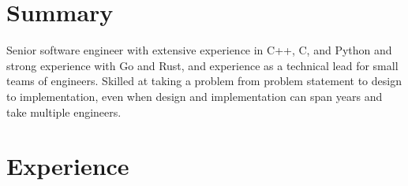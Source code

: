 \documentclass[overlapped]{res}
\begin{document}

\address{
  \href{mailto:miriam@mutexlox.com}{miriam@mutexlox.com} \\
  \hfill \href{https://www.linkedin.com/in/miriam-zimmerman-9a2507117}{www.linkedin.com/in/miriam-zimmerman-9a2507117} \\
}
\address{  %
  \hfill \href{https://mutexlox.com}{https://mutexlox.com} \\
  \hfill Boston, Massachusetts
}

\begin{resume}


\section{Summary}
  Senior software engineer with extensive experience in C++, C, and Python and
  strong experience with Go and Rust, and experience as a technical lead for
  small teams of engineers. Skilled at taking a problem from problem
  statement to design to implementation, even when design and implementation
  can span years and take multiple engineers.

\section{Experience}
  \vspace{0.5ex}


\end{resume}
\end{document}
